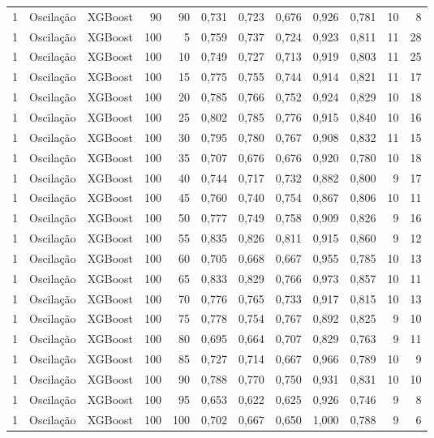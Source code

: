 \begin{longtable}{@{}rllrrrrrrrrr@{}}
1 & Oscilação & XGBoost & 90 & 90 & 0,731 & 0,723 & 0,676 & 0,926 & 0,781 & 10 & 8 \\
1 & Oscilação & XGBoost & 100 & 5 & 0,759 & 0,737 & 0,724 & 0,923 & 0,811 & 11 & 28 \\
1 & Oscilação & XGBoost & 100 & 10 & 0,749 & 0,727 & 0,713 & 0,919 & 0,803 & 11 & 25 \\
1 & Oscilação & XGBoost & 100 & 15 & 0,775 & 0,755 & 0,744 & 0,914 & 0,821 & 11 & 17 \\
1 & Oscilação & XGBoost & 100 & 20 & 0,785 & 0,766 & 0,752 & 0,924 & 0,829 & 10 & 18 \\
1 & Oscilação & XGBoost & 100 & 25 & 0,802 & 0,785 & 0,776 & 0,915 & 0,840 & 10 & 16 \\
1 & Oscilação & XGBoost & 100 & 30 & 0,795 & 0,780 & 0,767 & 0,908 & 0,832 & 11 & 15 \\
1 & Oscilação & XGBoost & 100 & 35 & 0,707 & 0,676 & 0,676 & 0,920 & 0,780 & 10 & 18 \\
1 & Oscilação & XGBoost & 100 & 40 & 0,744 & 0,717 & 0,732 & 0,882 & 0,800 & 9 & 17 \\
1 & Oscilação & XGBoost & 100 & 45 & 0,760 & 0,740 & 0,754 & 0,867 & 0,806 & 10 & 11 \\
1 & Oscilação & XGBoost & 100 & 50 & 0,777 & 0,749 & 0,758 & 0,909 & 0,826 & 9 & 16 \\
1 & Oscilação & XGBoost & 100 & 55 & 0,835 & 0,826 & 0,811 & 0,915 & 0,860 & 9 & 12 \\
1 & Oscilação & XGBoost & 100 & 60 & 0,705 & 0,668 & 0,667 & 0,955 & 0,785 & 10 & 13 \\
1 & Oscilação & XGBoost & 100 & 65 & 0,833 & 0,829 & 0,766 & 0,973 & 0,857 & 10 & 11 \\
1 & Oscilação & XGBoost & 100 & 70 & 0,776 & 0,765 & 0,733 & 0,917 & 0,815 & 10 & 13 \\
1 & Oscilação & XGBoost & 100 & 75 & 0,778 & 0,754 & 0,767 & 0,892 & 0,825 & 9 & 10 \\
1 & Oscilação & XGBoost & 100 & 80 & 0,695 & 0,664 & 0,707 & 0,829 & 0,763 & 9 & 11 \\
1 & Oscilação & XGBoost & 100 & 85 & 0,727 & 0,714 & 0,667 & 0,966 & 0,789 & 10 & 9 \\
1 & Oscilação & XGBoost & 100 & 90 & 0,788 & 0,770 & 0,750 & 0,931 & 0,831 & 10 & 10 \\
1 & Oscilação & XGBoost & 100 & 95 & 0,653 & 0,622 & 0,625 & 0,926 & 0,746 & 9 & 8 \\
1 & Oscilação & XGBoost & 100 & 100 & 0,702 & 0,667 & 0,650 & 1,000 & 0,788 & 9 & 6 \\

\end{longtable}
